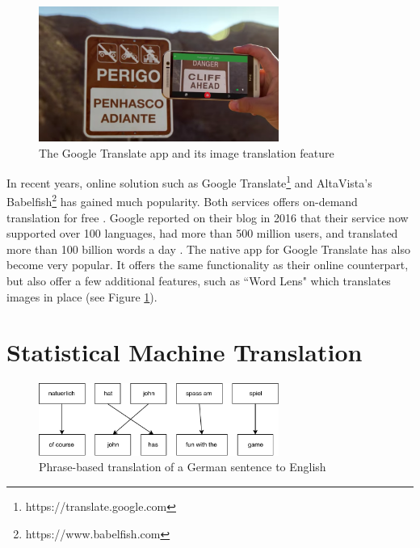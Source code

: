 \begin{figure}[H]
    \centering
    \includegraphics[width=0.7\textwidth]{fig/background_theory/google_translate_rt.png}
    \caption{The Google Translate app and its image translation feature}
    \label{fig:google-translate-rt}
\end{figure}

In recent years, online solution such as Google Translate\footnote{https://translate.google.com} and AltaVista's Babelfish\footnote{https://www.babelfish.com} has gained much popularity. Both services offers on-demand translation for free \citep{hutchins2007machine}. Google reported on their blog in 2016 that their service now supported over 100 languages, had more than 500 million users, and translated more than 100 billion words a day \citep{turovsky2016googletranslate}. The native app for Google Translate has also become very popular. It offers the same functionality as their online counterpart, but also offer a few additional features, such as ``Word Lens" which translates images in place (see Figure \ref{fig:google-translate-rt}).


\section{Statistical Machine Translation}
\begin{figure}[ht]
    \centering
    \includegraphics[width=0.7\textwidth]{fig/related_work/translation_de_en.pdf}
    \caption{Phrase-based translation of a German sentence to English}
    \label{fig:translation-phrase-based}
\end{figure}

